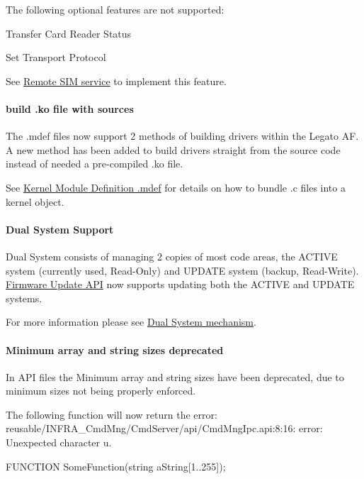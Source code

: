 The following optional features are not supported\+:
\begin{DoxyItemize}
\item Transfer Card Reader Status
\item Set Transport Protocol
\end{DoxyItemize}

See \hyperlink{c_rsim}{Remote S\+IM service} to implement this feature.\hypertarget{releaseNotes17050_rn17_05_FeaturesMdefSource}{}\paragraph{build .\+ko file with sources}\label{releaseNotes17050_rn17_05_FeaturesMdefSource}
The {\ttfamily }.mdef files now support 2 methods of building drivers within the Legato AF. A new method has been added to build drivers straight from the source code instead of needed a pre-\/compiled {\ttfamily }.ko file.

See \hyperlink{defFilesMdef}{Kernel Module Definition .mdef} for details on how to bundle {\ttfamily }.c files into a kernel object.\hypertarget{releaseNotes17050_rn17_05_FeaturesDualSS}{}\paragraph{Dual System Support}\label{releaseNotes17050_rn17_05_FeaturesDualSS}
Dual System consists of managing 2 copies of most code areas, the A\+C\+T\+I\+VE system (currently used, Read-\/\+Only) and U\+P\+D\+A\+TE system (backup, Read-\/\+Write). \hyperlink{c_fwupdate}{Firmware Update A\+PI} now supports updating both the A\+C\+T\+I\+VE and U\+P\+D\+A\+TE systems.

For more information please see \hyperlink{platformConstraintsDualSys}{Dual System mechanism}.\hypertarget{releaseNotes17050_rn17_05_FeaturesMinimumArray}{}\paragraph{Minimum array and string sizes deprecated}\label{releaseNotes17050_rn17_05_FeaturesMinimumArray}
In A\+PI files the Minimum array and string sizes have been deprecated, due to minimum sizes not being properly enforced.

The following function will now return the error\+: {\ttfamily  reusable/\+I\+N\+F\+R\+A\+\_\+\+Cmd\+Mng/\+Cmd\+Server/api/\+Cmd\+Mng\+Ipc.\+api\+:8\+:16\+: error\+: Unexpected character u\textquotesingle{}.\textquotesingle{} } 
\begin{DoxyCode}
FUNCTION SomeFunction(\textcolor{keywordtype}{string} aString[1..255]);
\end{DoxyCode}


